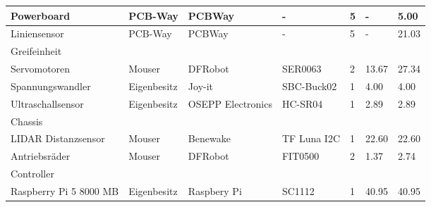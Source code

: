 \documentclass[main.tex]{subfiles} %
\begin{document}
\begin{table}[htbp]
{\begin{tabular}{|p{3cm}|p{2.5cm}|p{2.5cm}|p{3cm}|p{1cm}|p{1.5cm}|p{1cm}|}
            Powerboard                              & PCB-Way            & PCBWay                       & -                       & 5               & -                         & 5.00                           \\ \hline
            Liniensensor                            & PCB-Way            & PCBWay                       & -                       & 5               & -                         & 21.03                       \\ \hline
            \rowcolor{lightgray} Greifeinheit       &                    &                              &                         &                 &                           &                             \\ \hline
            Servomotoren                            & Mouser             & DFRobot                      & SER0063                 & 2               & 13.67                     & 27.34                       \\ \hline
            Spannungswandler                        & Eigenbesitz        & Joy-it                       & SBC-Buck02              & 1               & 4.00                         & 4.00                         \\ \hline
            Ultraschallsensor                       & Eigenbesitz        & OSEPP Electronics            & HC-SR04                 & 1               & 2.89                      & 2.89                        \\ \hline
            \rowcolor{lightgray} Chassis            &                    &                              &                         &                 &                           &                             \\ \hline
            LIDAR Distanzsensor                     & Mouser             & Benewake                     & TF Luna I2C             & 1               & 22.60                      & 22.60                        \\ \hline
            Antriebsräder                           & Mouser             & DFRobot                      & FIT0500                 & 2               & 1.37                      & 2.74                        \\ \hline
            \rowcolor{lightgray} Controller         &                    &                              &                         &                 &                           &                             \\ \hline
            Raspberry Pi 5 8000 MB                  & Eigenbesitz        & Raspbery Pi                  & SC1112                  & 1               & 40.95                     & 40.95                       \\ \hline

\end{tabular}}
\end{table}
\end{document}
